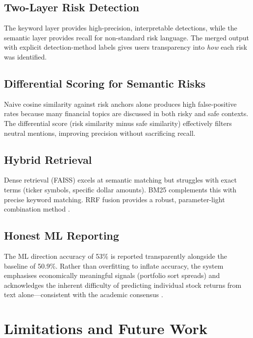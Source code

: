 \documentclass[12pt,a4paper]{article}
\begin{document}
\subsection{Two-Layer Risk Detection}

The keyword layer provides high-precision, interpretable detections, while the semantic layer provides recall for non-standard risk language. The merged output with explicit detection-method labels gives users transparency into \emph{how} each risk was identified.

\subsection{Differential Scoring for Semantic Risks}

Naive cosine similarity against risk anchors alone produces high false-positive rates because many financial topics are discussed in both risky and safe contexts. The differential score (risk similarity minus safe similarity) effectively filters neutral mentions, improving precision without sacrificing recall.

\subsection{Hybrid Retrieval}

Dense retrieval (FAISS) excels at semantic matching but struggles with exact terms (ticker symbols, specific dollar amounts). BM25 complements this with precise keyword matching. RRF fusion provides a robust, parameter-light combination method \citep{cormack2009reciprocal}.

\subsection{Honest ML Reporting}

The ML direction accuracy of 53\% is reported transparently alongside the baseline of 50.9\%. Rather than overfitting to inflate accuracy, the system emphasises economically meaningful signals (portfolio sort spreads) and acknowledges the inherent difficulty of predicting individual stock returns from text alone---consistent with the academic consensus \citep{chen2018sentimental}.


\section{Limitations and Future Work}
\label{sec:limitations}
\end{document}
